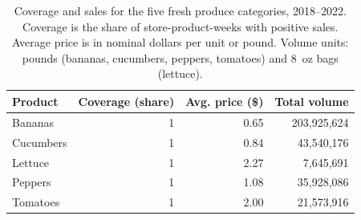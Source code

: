 \begin{table}[!h]
\centering
\caption{\label{tab:tab:product_coverage}Coverage and sales for the five fresh produce categories, 2018--2022. Coverage is the share of store-product-weeks with positive sales. Average price is in nominal dollars per unit or pound. Volume units: pounds (bananas, cucumbers, peppers, tomatoes) and 8~oz bags (lettuce).}
\centering
\begin{tabular}[t]{lrrr}
\toprule
Product & Coverage (share) & Avg. price (\$) & Total volume\\
\midrule
Bananas & 1 & 0.65 & 203,925,624\\
Cucumbers & 1 & 0.84 & 43,540,176\\
Lettuce & 1 & 2.27 & 7,645,691\\
Peppers & 1 & 1.08 & 35,928,086\\
Tomatoes & 1 & 2.00 & 21,573,916\\
\bottomrule
\end{tabular}
\end{table}
